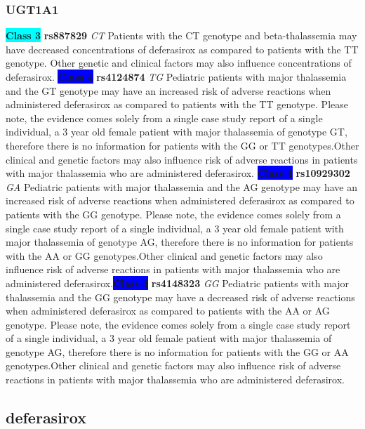 \documentclass{book}
\begin{document}
\subsubsection{ UGT1A1 }

\begin{center}
\textbf{\colorbox{cyan} {Class 3}} \textbf{ rs887829 } \textit{ CT }
Patients with the CT genotype and beta-thalassemia may have decreased concentrations of deferasirox as compared to patients with the TT genotype. Other genetic and clinical factors may also influence concentrations of deferasirox.
\textbf{\colorbox{blue} {Class 4}} \textbf{ rs4124874 } \textit{ TG }
Pediatric patients with major thalassemia and the GT genotype may have an increased risk of adverse reactions when administered deferasirox as compared to patients with the TT genotype. Please note, the evidence comes solely from a single case study report of a single individual, a 3 year old female patient with major thalassemia of genotype GT, therefore there is no information for patients with the GG or TT genotypes.Other clinical and genetic factors may also influence risk of adverse reactions in patients with major thalassemia who are administered deferasirox. \textbf{\colorbox{blue} {Class 4}} \textbf{ rs10929302 } \textit{ GA }
Pediatric patients with major thalassemia and the AG genotype may have an increased risk of adverse reactions when administered deferasirox as compared to patients with the GG genotype. Please note, the evidence comes solely from a single case study report of a single individual, a 3 year old female patient with major thalassemia of genotype AG, therefore there is no information for patients with the AA or GG genotypes.Other clinical and genetic factors may also influence risk of adverse reactions in patients with major thalassemia who are administered deferasirox.\textbf{\colorbox{blue} {Class 4}} \textbf{ rs4148323 } \textit{ GG }
Pediatric patients with major thalassemia and the GG genotype may have a decreased risk of adverse reactions when administered deferasirox as compared to patients with the AA or AG genotype. Please note, the evidence comes solely from a single case study report of a single individual, a 3 year old female patient with major thalassemia of genotype AG, therefore there is no information for patients with the GG or AA genotypes.Other clinical and genetic factors may also influence risk of adverse reactions in patients with major thalassemia who are administered deferasirox.

\end{center}\subsection{ deferasirox }
\end{document}
